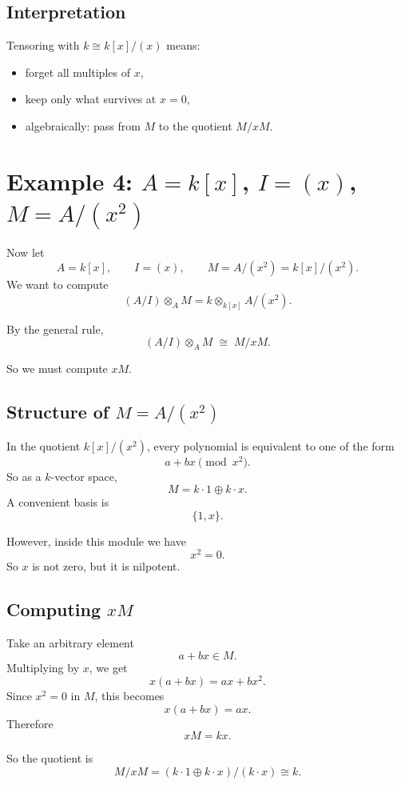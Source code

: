 \documentclass[12pt,a4paper]{article}
\theoremstyle{plain}
\theoremstyle{definition}      %
\begin{document}
	\subsection{Interpretation}
	
	Tensoring with \(k\cong k[x]/(x)\) means:
	\begin{itemize}
		\item forget all multiples of \(x\),
		\item keep only what survives at \(x=0\),
		\item algebraically: pass from \(M\) to the quotient \(M/xM\).
	\end{itemize}
	
	\section{Example 4: \texorpdfstring{$A=k[x]$, $I=(x)$, $M=A/(x^2)$}{A=k[x], I=(x), M=A/(x\^2)}}
	
	Now let
	\[
	A=k[x], \qquad I=(x), \qquad M=A/(x^2)=k[x]/(x^2).
	\]
	We want to compute
	\[
	(A/I)\otimes_A M
	=
	k\otimes_{k[x]} A/(x^2).
	\]
	
	By the general rule,
	\[
	(A/I)\otimes_A M
	\;\cong\;
	M/xM.
	\]
	
	So we must compute \(xM\).
	
	\subsection{Structure of \texorpdfstring{$M=A/(x^2)$}{M=A/(x\^2)}}
	
	In the quotient \(k[x]/(x^2)\), every polynomial is equivalent to one of the form
	\[
	a+bx \pmod{x^2}.
	\]
	So as a \(k\)-vector space,
	\[
	M = k\cdot 1 \oplus k\cdot x.
	\]
	A convenient basis is
	\[
	\{1,x\}.
	\]
	
	However, inside this module we have
	\[
	x^2=0.
	\]
	So \(x\) is not zero, but it is nilpotent.
	
	\subsection{Computing \texorpdfstring{$xM$}{xM}}
	
	Take an arbitrary element
	\[
	a+bx \in M.
	\]
	Multiplying by \(x\), we get
	\[
	x(a+bx)=ax+bx^2.
	\]
	Since \(x^2=0\) in \(M\), this becomes
	\[
	x(a+bx)=ax.
	\]
	Therefore
	\[
	xM = kx.
	\]
	
	So the quotient is
	\[
	M/xM = (k\cdot 1 \oplus k\cdot x)/(k\cdot x)\cong k.
	\]
	
\end{document}
